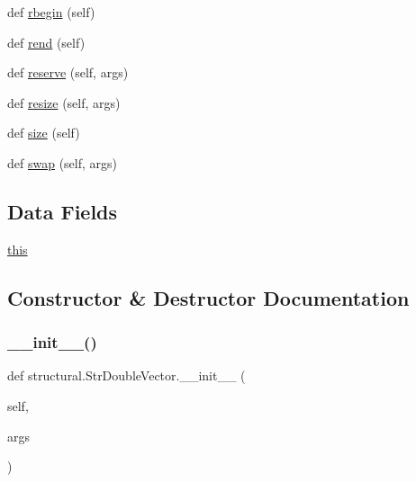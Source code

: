 \begin{DoxyCompactItemize}
def \hyperlink{classstructural_1_1_str_double_vector_a3f893c9bf81a1071a5bf36cb3dcdc959}{rbegin} (self)
\item 
def \hyperlink{classstructural_1_1_str_double_vector_a494182c5104be917acd83025f2f51d4b}{rend} (self)
\item 
def \hyperlink{classstructural_1_1_str_double_vector_a16c336e9dc87e2b0d725dc74e2188778}{reserve} (self, args)
\item 
def \hyperlink{classstructural_1_1_str_double_vector_a555d5f2195c71a253e12d52ca773bb0d}{resize} (self, args)
\item 
def \hyperlink{classstructural_1_1_str_double_vector_a25ac32f4104aa0bad324c22b6685eac5}{size} (self)
\item 
def \hyperlink{classstructural_1_1_str_double_vector_a682e836115652cbdf6f1838088c0ea84}{swap} (self, args)
\end{DoxyCompactItemize}
\subsection*{Data Fields}
\begin{DoxyCompactItemize}
\item 
\hyperlink{classstructural_1_1_str_double_vector_ad266eb00ada2c457e7099159b7a37998}{this}
\end{DoxyCompactItemize}


\subsection{Constructor \& Destructor Documentation}
\mbox{\label{classstructural_1_1_str_double_vector_a3e1dbbb190ec7f44a7fde7b13119eacb}} 
\subsubsection{\texorpdfstring{\+\_\+\+\_\+init\+\_\+\+\_\+()}{\_\_init\_\_()}}
{\footnotesize\ttfamily def structural.\+Str\+Double\+Vector.\+\_\+\+\_\+init\+\_\+\+\_\+ (\begin{DoxyParamCaption}\item[{}]{self,  }\item[{}]{args }\end{DoxyParamCaption})}



